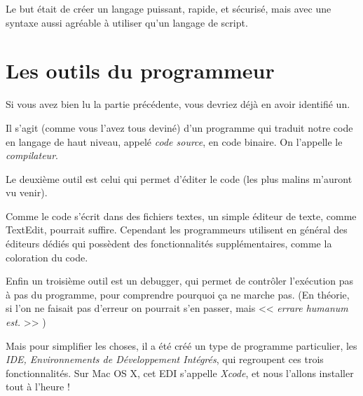 Le but était de créer un langage puissant, rapide, et sécurisé, mais avec une syntaxe
aussi agréable à utiliser qu’un langage de script.
\section{Les outils du programmeur}
Si vous avez bien lu la partie précédente, vous devriez déjà en avoir identifié un.

Il s'agit (comme vous l'avez tous deviné) d'un programme qui traduit notre code en
langage de haut niveau, appelé \emph{code source}, en code binaire. On l'appelle le
\emph{compilateur}.


Le deuxième outil est celui qui permet d'éditer le code (les plus malins m'auront vu venir).

Comme le code s'écrit dans des fichiers textes, un simple éditeur de texte, comme
TextEdit, pourrait suffire. Cependant les programmeurs utilisent en général des éditeurs
dédiés qui possèdent des fonctionnalités supplémentaires, comme la coloration du code.

Enfin un troisième outil est un debugger, qui permet de contrôler l'exécution pas à pas du
programme, pour comprendre pourquoi ça ne marche pas. (En théorie, si l'on ne faisait
pas d'erreur on pourrait s'en passer, mais << \emph{errare humanum est.} >> )

Mais pour simplifier les choses, il a été créé un type de programme particulier, les \emph{IDE,
Environnements de Développement Intégrés}, qui regroupent ces trois fonctionnalités. Sur
Mac OS X, cet EDI s'appelle \emph{Xcode}, et nous l'allons installer tout à l'heure !